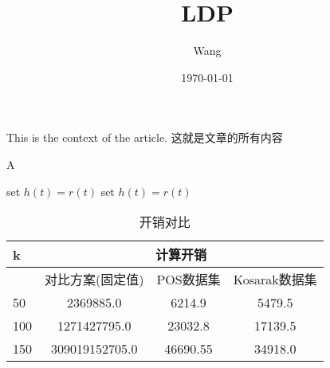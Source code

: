 \documentclass[UTF8]{ctexart}
\title{LDP}
\author{Wang}
\date{\today}
\begin{document}
    \maketitle
    This is the context of the article.
    这就是文章的所有内容
    \begin{algorithm}
        \caption{A}
        \label{alg:A}
        \begin{algorithmic}
            \REPEAT 
                \STATE set $h(t)=r(t)$ 
                \REPEAT
                    \STATE set $h(t)=r(t)$ 
        \end{algorithmic}
    \end{algorithm}


\begin{table}[!htbp]
		\centering
		\begin{tabular}{l|ccc}\hline
			k&\multicolumn{3}{c}{计算开销}\\\hline
			&对比方案(固定值)&POS数据集&Kosarak数据集\\
			50&2369885.0&6214.9&5479.5\\
			100&1271427795.0&23032.8&17139.5\\
			150&309019152705.0&46690.55&34918.0\\\hline
		\end{tabular}
		\caption{开销对比}
		\label{tab:computation}
\end{table}
\end{document}
